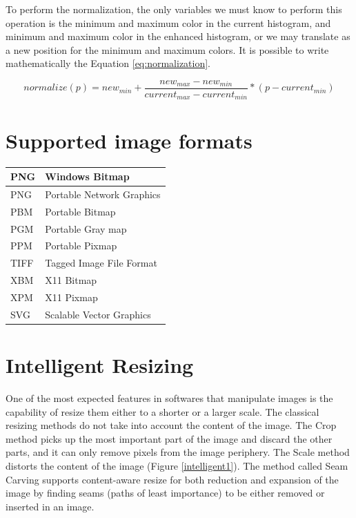 \documentclass{article}
\begin{document}
		

		To perform the normalization, the only variables we must know to perform this operation is the minimum and maximum color in the current histogram, 
		and minimum and maximum color in the enhanced histogram, or we may translate as a new position for the minimum and maximum colors. It is possible
		to write mathematically the Equation \ref{eq:normalization}. \nocite{*}


		\begin{equation}
			normalize(p)=new_{min}+\frac{new_{max}-new_{min}}{current_{max}-current_{min}}*(p-current_{min})
			\label{eq:normalization}
		\end{equation}
		
\section{Supported image formats}


		\begin{center}
		    \begin{tabular}{ | l | l |}
		    \hline
		    	PNG & Windows Bitmap \\ \hline
			PNG & Portable Network Graphics\\ \hline
			PBM & Portable Bitmap\\ \hline
			PGM & Portable Gray map\\ \hline
			PPM & Portable Pixmap\\ \hline
			TIFF & Tagged Image File Format\\ \hline
			XBM & X11 Bitmap\\ \hline
			XPM & X11 Pixmap\\ \hline
			SVG & Scalable Vector Graphics\\ \hline
		    \end{tabular}
		\end{center}

\section{Intelligent Resizing}

	One of the most expected features in softwares that manipulate images is the capability of resize them either to a shorter or a larger scale. The classical resizing methods do not take into account the content of the image. The Crop method picks up the most important part of the image and discard the other parts, and it can only remove pixels from the image periphery. The Scale method distorts the content of the image (Figure \ref{intelligent1}). The method called Seam Carving supports content-aware resize for both reduction and expansion of the image by finding seams (paths of least importance) to be either removed or inserted in an image.
\end{document}
